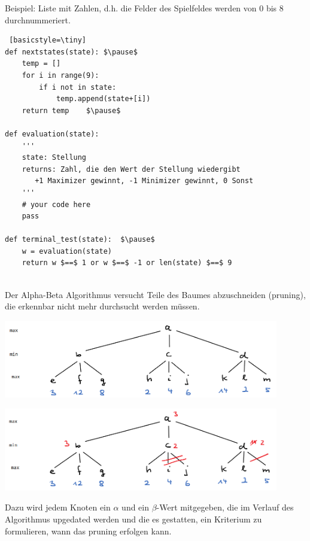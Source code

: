 \begin{frame}[fragile]
Beispiel: Liste mit Zahlen, d.h. die Felder des Spielfeldes werden von 0 bis 8 durchnummeriert.
\begin{lstlisting} [basicstyle=\tiny]
def nextstates(state): $\pause$
    temp = []
    for i in range(9):
        if i not in state:
            temp.append(state+[i])
    return temp    $\pause$

def evaluation(state): 
    '''
    state: Stellung
    returns: Zahl, die den Wert der Stellung wiedergibt
       +1 Maximizer gewinnt, -1 Minimizer gewinnt, 0 Sonst
    '''
    # your code here
    pass

def terminal_test(state):  $\pause$
    w = evaluation(state)
    return w $==$ 1 or w $==$ -1 or len(state) $==$ 9 


\end{lstlisting} 
\end{frame}



\begin{frame}[fragile]
Der Alpha-Beta Algorithmus versucht Teile des Baumes abzuschneiden (pruning), die erkennbar nicht mehr durchsucht werden müssen.

\includegraphics[width=12cm]{bild12.png} 
\end{frame}

\begin{frame}[fragile]
\includegraphics[width=12cm]{bild13.png}  \pause

Dazu wird jedem Knoten ein $\alpha$  und ein $\beta$-Wert mitgegeben, die im Verlauf des Algorithmus upgedated
werden und die es gestatten, ein Kriterium zu formulieren, wann das pruning erfolgen kann.
\end{frame}

